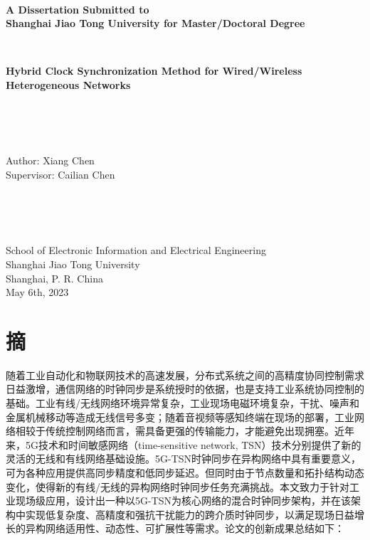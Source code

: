 \documentclass[UTF8,a4paper,12pt]{ctexart}
\numberwithin{equation}{section}
\begin{document}
	\newpage
	\thispagestyle{empty}
	~\\
	\begin{center}
		\textbf{
			A Dissertation Submitted to \\
			Shanghai Jiao Tong University for Master/Doctoral Degree}
	\end{center}
	~\\
	\begin{center}
		\textbf{
			Hybrid Clock Synchronization Method for Wired/Wireless Heterogeneous Networks}
	\end{center}
	~\\
	~\\
	~\\
	\begin{center}
		Author: Xiang Chen \\
		Supervisor:  Cailian Chen
	\end{center}
	~\\
	~\\
	~\\
	\begin{center}
		School of Electronic Information and Electrical Engineering \\
		Shanghai Jiao Tong University \\
		Shanghai, P. R. China \\
		May 6th, 2023  
	\end{center}
	
	
	\newpage
	
	\section*{摘}
	
	
	随着工业自动化和物联网技术的高速发展，分布式系统之间的高精度协同控制需求日益激增，通信网络的时钟同步是系统授时的依据，也是支持工业系统协同控制的基础。工业有线/无线网络环境异常复杂，工业现场电磁环境复杂，干扰、噪声和金属机械移动等造成无线信号多变；随着音视频等感知终端在现场的部署，工业网络相较于传统控制网络而言，需具备更强的传输能力，才能避免出现拥塞。近年来，5G技术和时间敏感网络（time-sensitive network, TSN）技术分别提供了新的灵活的无线和有线网络基础设施。5G-TSN时钟同步在异构网络中具有重要意义，可为各种应用提供高同步精度和低同步延迟。但同时由于节点数量和拓扑结构动态变化，使得新的有线/无线的异构网络时钟同步任务充满挑战。本文致力于针对工业现场级应用，设计出一种以5G-TSN为核心网络的混合时钟同步架构，并在该架构中实现低复杂度、高精度和强抗干扰能力的跨介质时钟同步，以满足现场日益增长的异构网络适用性、动态性、可扩展性等需求。论文的创新成果总结如下：
	
\end{document}
